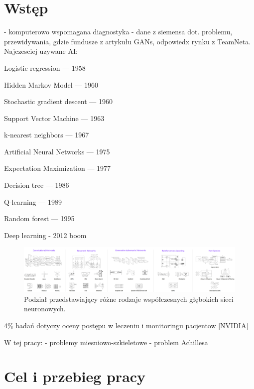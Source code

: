 \chapter{Wstęp}

- komputerowo wspomagana diagnostyka - dane z siemensa dot. problemu, przewidywania, gdzie fundusze z artykułu GANs, odpowiedx rynku z TeamNeta. Najczesciej uzywane AI:

Logistic regression — 1958 

Hidden Markov Model — 1960 

Stochastic gradient descent — 1960 

Support Vector Machine — 1963 

k-nearest neighbors — 1967 

Artificial Neural Networks — 1975 

Expectation Maximization — 1977 

Decision tree — 1986 

Q-learning — 1989 

Random forest — 1995 

Deep learning - 2012 boom



\begin{figure}[h!]
	\centering
	\includegraphics[width=1.0\textwidth]{figures/rodzajeSieciNeuronowych.png}
	\caption{Podział przedstawiający różne rodzaje współczesnych głębokich sieci neuronowych.}
	\label{DLcambrianExplosion}
\end{figure}

4\% badań dotyczy oceny postępu w leczeniu i monitoringu pacjentow [NVIDIA]

W tej pracy:
- problemy miesniowo-szkieletowe
- problem Achillesa 


\chapter{Cel i przebieg pracy}




